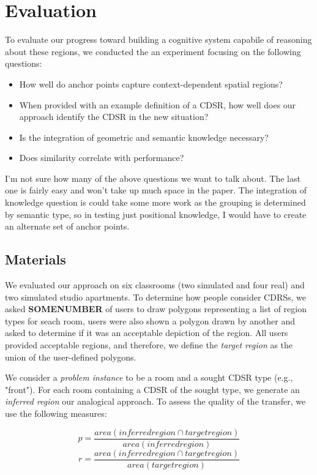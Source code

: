 \documentclass[letterpaper]{article}
\begin{document}
 \section{Evaluation}

To evaluate our progress toward building a cognitive system capabile of reasoning about these regions, we conducted the an experiment focusing on the following questions:
\begin{itemize}
\item{How well do anchor points capture context-dependent spatial regions?}
\item{When provided with an example definition of a CDSR, how well does our approach identify the CDSR in the new situation?}
\item{Is the integration of geometric and semantic knowledge necessary?}
\item{Does similarity correlate with performance?}
\end{itemize}

I'm not sure how many of the above questions we want to talk about. The last one is fairly easy and won't take up much space in the paper. The integration of knowledge question is could take some more work as the grouping is determined by semantic type, so in testing just positional knowledge,  I would have to create an alternate set of anchor points.

\subsection{Materials}
We evaluated our approach on six classrooms (two simulated and four real) and two simulated studio apartments. To determine how people consider CDRSs, we asked \textbf{SOMENUMBER} of users to draw polygons representing a list of region types for seach room, users were also shown a polygon drawn by another and asked to determine if it was an acceptable depiction of the region. All users provided acceptable regions, and therefore, we define the \textit{target region} as the union of the user-defined polygons.

We consider a \textit{problem instance} to be a room and a sought CDSR type (e.g., "front"). For each room containing a CDSR of the sought type, we generate an \textit{inferred region} our analogical approach. To assess the quality of the transfer, we use the following measures:

\begin{equation}
	p=\frac{area(inferred region \cap target region)}{area(inferred region)}
\end{equation}
\begin{equation}
	r=\frac{area(inferred region \cap target region)}{area(target region)}
\end{equation}
\end{document}
